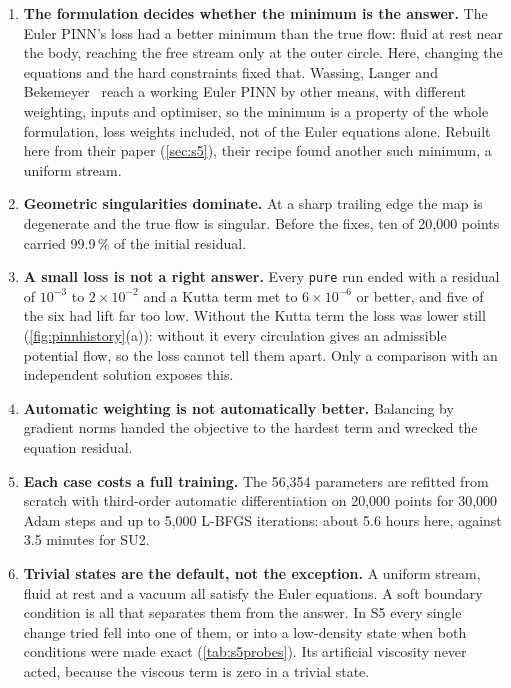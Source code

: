 \begin{enumerate}
  \item \textbf{The formulation decides whether the minimum is the answer.} The Euler PINN's loss
    had a better minimum than the true flow: fluid at rest near the body, reaching the free stream
    only at the outer circle. Here, changing the equations and the hard constraints fixed that.
    Wassing, Langer and Bekemeyer~\cite{wassing2025} reach a working Euler PINN by other means,
    with different weighting, inputs and optimiser, so the minimum is a property of the whole
    formulation, loss weights included, not of the Euler equations alone. Rebuilt here from their
    paper (\cref{sec:s5}), their recipe found another such minimum, a uniform stream.
  \item \textbf{Geometric singularities dominate.} At a sharp trailing edge the map is degenerate
    and the true flow is singular. Before the fixes, ten of 20,000 points carried 99.9\,\% of the
    initial residual.
  \item \textbf{A small loss is not a right answer.} Every \texttt{pure} run ended with a residual
    of $10^{-3}$ to $2\times10^{-2}$ and a Kutta term met to $6\times10^{-6}$ or better, and five of the six had lift
    far too low. Without the Kutta term the loss was lower still (\cref{fig:pinnhistory}(a)):
    without it every circulation gives an admissible potential flow, so the loss cannot tell them
    apart. Only a comparison with an independent solution exposes this.
  \item \textbf{Automatic weighting is not automatically better.} Balancing by gradient norms
    handed the objective to the hardest term and wrecked the equation residual.
  \item \textbf{Each case costs a full training.} The 56,354 parameters are refitted from scratch
    with third-order automatic differentiation on 20,000 points for 30,000 Adam steps and up to
    5,000 L-BFGS iterations: about 5.6 hours here, against 3.5 minutes for SU2.
  \item \textbf{Trivial states are the default, not the exception.} A uniform stream, fluid at
    rest and a vacuum all satisfy the Euler equations. A soft boundary condition is all that
    separates them from the answer. In S5 every single change tried fell into one of them, or into
    a low-density state when both conditions were made exact (\cref{tab:s5probes}). Its
    artificial viscosity never acted, because the viscous term is zero in a trivial state.
\end{enumerate}

